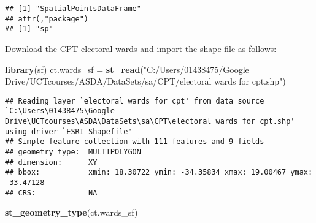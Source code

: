 \documentclass[
]{book}
\newenvironment{Shaded}{\begin{snugshade}}{\end{snugshade}}
\newcommand{\KeywordTok}[1]{\textcolor[rgb]{0.13,0.29,0.53}{\textbf{#1}}}
\newcommand{\NormalTok}[1]{#1}
\newcommand{\StringTok}[1]{\textcolor[rgb]{0.31,0.60,0.02}{#1}}
\begin{document}
\begin{verbatim}
## [1] "SpatialPointsDataFrame"
## attr(,"package")
## [1] "sp"
\end{verbatim}

Download the CPT electoral wards and import the shape file as follows:

\begin{Shaded}
\begin{Highlighting}[]
\KeywordTok{library}\NormalTok{(sf)}
\NormalTok{ct.wards_sf =}\StringTok{ }\KeywordTok{st_read}\NormalTok{(}\StringTok{"C:/Users/01438475/Google Drive/UCTcourses/ASDA/DataSets/sa/CPT/electoral wards for cpt.shp"}\NormalTok{)}
\end{Highlighting}
\end{Shaded}

\begin{verbatim}
## Reading layer `electoral wards for cpt' from data source `C:\Users\01438475\Google Drive\UCTcourses\ASDA\DataSets\sa\CPT\electoral wards for cpt.shp' using driver `ESRI Shapefile'
## Simple feature collection with 111 features and 9 fields
## geometry type:  MULTIPOLYGON
## dimension:      XY
## bbox:           xmin: 18.30722 ymin: -34.35834 xmax: 19.00467 ymax: -33.47128
## CRS:            NA
\end{verbatim}

\begin{Shaded}
\begin{Highlighting}[]
\KeywordTok{st_geometry_type}\NormalTok{(ct.wards_sf)}
\end{Highlighting}
\end{Shaded}
\end{document}
